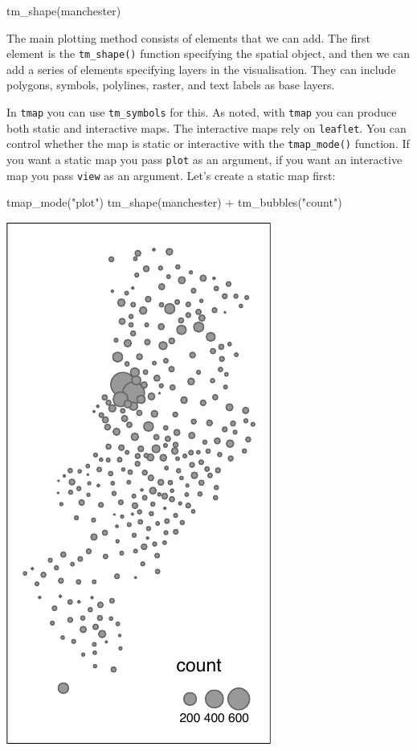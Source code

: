 \documentclass[
]{book}
\newenvironment{Shaded}{\begin{snugshade}}{\end{snugshade}}
\newcommand{\FunctionTok}[1]{\textcolor[rgb]{0.00,0.00,0.00}{#1}}
\newcommand{\NormalTok}[1]{#1}
\newcommand{\SpecialCharTok}[1]{\textcolor[rgb]{0.00,0.00,0.00}{#1}}
\newcommand{\StringTok}[1]{\textcolor[rgb]{0.31,0.60,0.02}{#1}}
\begin{document}
\begin{Shaded}
\begin{Highlighting}[]
\FunctionTok{tm\_shape}\NormalTok{(manchester)}
\end{Highlighting}
\end{Shaded}

The main plotting method consists of elements that we can add. The first element is the \texttt{tm\_shape()} function specifying the spatial object, and then we can add a series of elements specifying layers in the visualisation. They can include polygons, symbols, polylines, raster, and text labels as base layers.

In \texttt{tmap} you can use \texttt{tm\_symbols} for this. As noted, with \texttt{tmap} you can produce both static and interactive maps. The interactive maps rely on \texttt{leaflet}. You can control whether the map is static or interactive with the \texttt{tmap\_mode()} function. If you want a static map you pass \texttt{plot} as an argument, if you want an interactive map you pass \texttt{view} as an argument. Let's create a static map first:

\begin{Shaded}
\begin{Highlighting}[]
\FunctionTok{tmap\_mode}\NormalTok{(}\StringTok{"plot"}\NormalTok{)}
\FunctionTok{tm\_shape}\NormalTok{(manchester) }\SpecialCharTok{+} 
  \FunctionTok{tm\_bubbles}\NormalTok{(}\StringTok{"count"}\NormalTok{)}
\end{Highlighting}
\end{Shaded}

\includegraphics{crime_mapping_files/figure-latex/unnamed-chunk-78-1.pdf}
\end{document}
